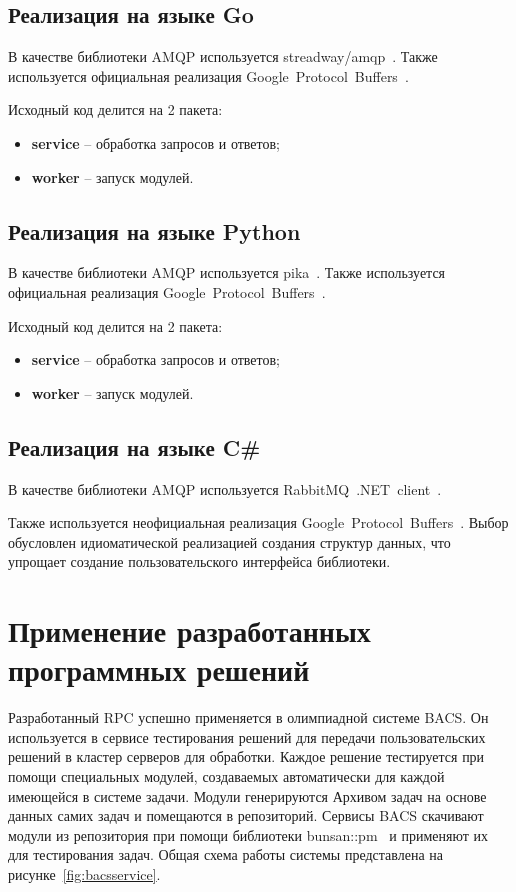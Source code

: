 \subsection{Реализация на языке Go}
В качестве библиотеки AMQP используется streadway/amqp~\cite{streadwayamqp}.
Также используется официальная реализация
Google~Protocol~Buffers~\cite{golangprotobuf}.

Исходный код делится на 2 пакета:
\begin{itemize}
    \item \textbf{service} -- обработка запросов и ответов;
    \item \textbf{worker} -- запуск модулей.
\end{itemize}

\subsection{Реализация на языке Python}
В качестве библиотеки AMQP используется pika~\cite{pika}.
Также используется официальная реализация
Google~Protocol~Buffers~\cite{protobuf}.

Исходный код делится на 2 пакета:
\begin{itemize}
    \item \textbf{service} -- обработка запросов и ответов;
    \item \textbf{worker} -- запуск модулей.
\end{itemize}

\subsection{Реализация на языке C\#}
В качестве библиотеки AMQP используется
RabbitMQ~.NET~client~\cite{rabbitmqdotnet}.

Также используется неофициальная реализация
Google~Protocol~Buffers~\cite{protobufnet}. Выбор обусловлен идиоматической
реализацией создания структур данных, что упрощает создание пользовательского
интерфейса библиотеки.

\section{Применение разработанных программных решений}
Разработанный RPC успешно применяется в олимпиадной системе BACS.
Он используется в сервисе тестирования решений для передачи пользовательских
решений в кластер серверов для обработки. Каждое решение тестируется
при помощи специальных модулей, создаваемых автоматически
для каждой имеющейся в системе задачи. Модули генерируются Архивом задач
на основе данных самих задач и помещаются в репозиторий. Сервисы BACS
скачивают модули из репозитория при помощи библиотеки bunsan::pm~\cite{bunsanpm}
и применяют их для тестирования задач. Общая схема работы системы
представлена на рисунке~\ref{fig:bacsservice}.

